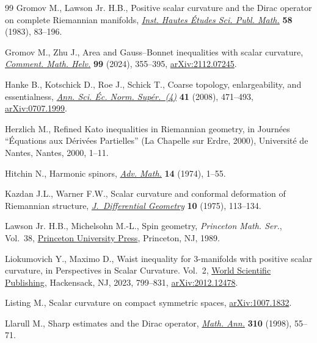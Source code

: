 \begin{thebibliography}{99}
Gromov M., Lawson Jr. H.B., Positive scalar curvature and the {D}irac operator
  on complete {R}iemannian manifolds, \href{https://doi.org/10.1007/BF02953774}{\textit{Inst. Hautes \'Etudes Sci. Publ.
  Math.}} \textbf{58} (1983), 83--196.

Gromov M., Zhu J., Area and {G}auss--{B}onnet inequalities with scalar
  curvature, \href{https://doi.org/10.4171/cmh/570}{\textit{Comment. Math. Helv.}} \textbf{99} (2024), 355--395,
  \href{https://arxiv.org/abs/2112.07245}{arXiv:2112.07245}.

Hanke B., Kotschick D., Roe J., Schick T., Coarse topology, enlargeability, and
  essentialness, \href{https://doi.org/10.24033/asens.2073}{\textit{Ann. Sci. \'Ec. Norm. Sup\'er.~(4)}} \textbf{41}
  (2008), 471--493, \href{https://arxiv.org/abs/0707.1999}{arXiv:0707.1999}.

Herzlich M., Refined {K}ato inequalities in {R}iemannian geometry, in
  Journ\'ees ``\'Equations aux {D}\'eriv\'ees {P}artielles'' ({L}a {C}hapelle
  sur {E}rdre, 2000), Universit\'e de Nantes, Nantes, 2000, 1--11.

Hitchin N., Harmonic spinors, \href{https://doi.org/10.1016/0001-8708(74)90021-8}{\textit{Adv. Math.}} \textbf{14} (1974), 1--55.

Kazdan J.L., Warner F.W., Scalar curvature and conformal deformation of
  {R}iemannian structure, \href{https://doi.org/10.4310/jdg/1214432678}{\textit{J.~Differential Geometry}} \textbf{10} (1975),
  113--134.

Lawson Jr. H.B., Michelsohn M.-L., Spin geometry, \textit{Princeton Math. Ser.},
  Vol.~38, \href{https://doi.org/10.1515/9781400883912}{Princeton University Press}, Princeton, NJ, 1989.

Liokumovich Y., Maximo D., Waist inequality for 3-manifolds with positive
  scalar curvature, in Perspectives in {S}calar {C}urvature. {V}ol.~2, \href{https://doi.org/10.1142/9789811273230_0022}{World
  Scientific Publishing}, Hackensack, NJ, 2023, 799--831, \href{https://arxiv.org/abs/2012.12478}{arXiv:2012.12478}.

Listing M., Scalar curvature on compact symmetric spaces, \href{https://arxiv.org/abs/1007.1832}{arXiv:1007.1832}.

Llarull M., Sharp estimates and the {D}irac operator, \href{https://doi.org/10.1007/s002080050136}{\textit{Math. Ann.}}
  \textbf{310} (1998), 55--71.


\end{thebibliography}
